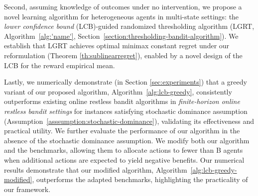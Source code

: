 {Second}, assuming knowledge of outcomes under no intervention, we propose a novel learning algorithm for heterogeneous agents in multi-state settings: the \emph{lower confidence bound} (LCB)-guided randomized thresholding algorithm (LGRT, Algorithm~\ref{alg:'name'}, Section~\ref{section:thresholding-bandit-algorithm}). We establish that LGRT achieves  optimal minimax constant regret under our reformulation
(Theorem \ref{th:sublinearregret}), enabled by
a novel design of the LCB for the reward empirical mean. 

{Lastly}, we numerically demonstrate (in Section \ref{sec:experiments}) that a greedy variant of our proposed algorithm,  Algorithm~\ref{alg:lcb-greedy}, consistently outperforms existing online restless bandit algorithms 
in \emph{finite-horizon online restless bandit settings} for instances satisfying stochastic dominance assumption (Assumption~\ref{asssumption:stochastic-dominance}), validating its effectiveness and practical utility.
We further evaluate the performance of our algorithm in the absence of the stochastic dominance assumption. We modify both our algorithm and the benchmarks, allowing them to allocate actions to fewer than 
B agents when additional actions are expected to yield negative benefits. 
Our numerical results demonstrate that our modified algorithm, Algorithm~\ref{alg:lcb-greedy-modified}, outperforms the adapted benchmarks, highlighting the practicality of our framework.


